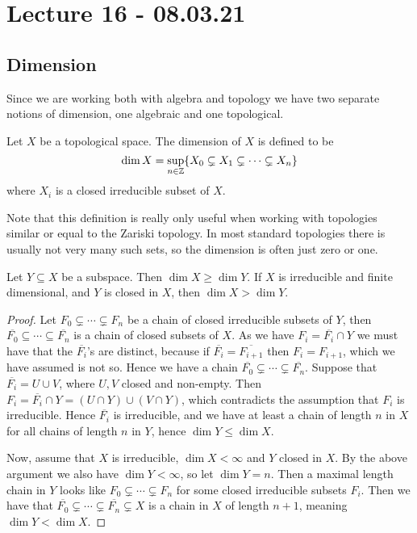 
\section{Lecture 16 - 08.03.21}

\subsection{Dimension}

Since we are working both with algebra and topology we have two separate notions of dimension, one algebraic and one topological. 

\begin{definition}
Let $X$ be a topological space. The dimension of $X$ is defined to be
\begin{equation*}
    \dim X = \sup_{n\in \mathbb{Z}}\{ X_0\subsetneq X_1\subsetneq \cdots \subsetneq X_n\}
\end{equation*}
where $X_i$ is a closed irreducible subset of $X$. 
\end{definition}

Note that this definition is really only useful when working with topologies similar or equal to the Zariski topology. In most standard topologies there is usually not very many such sets, so the dimension is often just zero or one. 

\begin{proposition}
Let $Y\subseteq X$ be a subspace. Then $\dim X \geq \dim Y$. If $X$ is irreducible and finite dimensional, and $Y$ is closed in $X$, then $\dim X > \dim Y$. 
\end{proposition}
\begin{proof}
Let $F_0\subsetneq \cdots \subsetneq F_n$ be a chain of closed irreducible subsets of $Y$, then $\overline{F_0} \subseteq \cdots \subseteq \overline{F_n}$ is a chain of closed subsets of $X$. As we have $F_i=\overline{F_i}\cap Y$ we must have that the $\overline{F_i}$'s are distinct, because if $\overline{F_i}=\overline{F_{i+1}}$ then $F_i=F_{i+1}$, which we have assumed is not so. Hence we have a chain $\overline{F_0}\subsetneq \cdots \subsetneq \overline{F_n}$. Suppose that $\overline{F_i}=U\cup V$, where $U, V$ closed and non-empty. Then $F_i=\overline{F_i}\cap Y = (U\cap Y)\cup (V\cap Y)$, which contradicts the assumption that $F_i$ is irreducible. Hence $\overline{F_i}$ is irreducible, and we have at least a chain of length $n$ in $X$ for all chains of length $n$ in $Y$, hence $\dim Y\leq \dim X$. 

Now, assume that $X$ is irreducible, $\dim X<\infty$ and $Y$ closed in $X$. By the above argument we also have $\dim Y< \infty$, so let $\dim Y=n$. Then a maximal length chain in $Y$ looks like $F_0\subsetneq \cdots \subsetneq F_n$ for some closed irreducible subsets $F_i$. Then we have that $\overline{F_0}\subsetneq \cdots \subsetneq \overline{F_n}\subsetneq X$ is a chain in $X$ of length $n+1$, meaning $\dim Y < \dim X$.
\end{proof}

